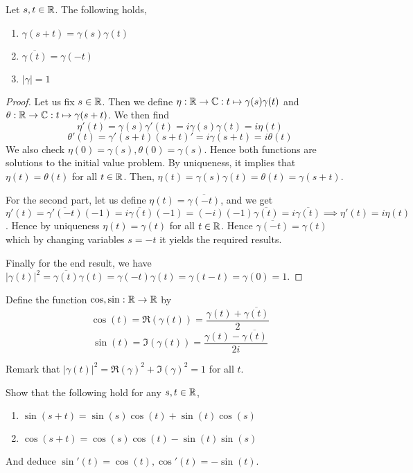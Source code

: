\begin{proposition}
    Let $s,t\in\mathbb R$. The following holds,
    \begin{enumerate}
        \item $\gamma(s+t)=\gamma(s)\gamma(t)$
        \item $\overline{\gamma(t)}=\gamma(-t)$
        \item $|\gamma|=1$
    \end{enumerate}
\end{proposition}
\begin{proof}
    Let us fix $s\in\mathbb R$. Then we define $\eta:\mathbb R\to\mathbb C:t\mapsto\gamma(s)\gamma(t)$ and
    $\theta:\mathbb R\to\mathbb C:t\mapsto\gamma(s+t)$. We then find
    \[\eta'(t)= \gamma(s)\gamma'(t)=i\gamma(s)\gamma(t)=i\eta(t)\]
    \[\theta'(t)= \gamma'(s+t) (s+t)'= i\gamma(s+t)=i\theta(t)\]
    We also check $\eta(0)=\gamma(s), \theta(0)=\gamma(s)$. Hence both functions are
    solutions to the initial value problem. By uniqueness, it implies that
    $\eta(t)=\theta(t)$ for all $t\in\mathbb R$. Then,
    $\eta(t)=\gamma(s)\gamma(t)=\theta(t)=\gamma(s+t)$.

    For the second part, let us define $\eta(t)=\overline{\gamma(-t)}$, and we get
    $\eta'(t)=\overline{\gamma'(-t)}(-1)=\overline{i\gamma(t)}(-1)=(-i)(-1)\overline{\gamma(t)}=
    i\overline{\gamma(t)}\implies \eta'(t)=i\eta(t)$. Hence by uniqueness
    $\eta(t)=\gamma(t)$ for all $t\in\mathbb R$. Hence $\overline{\gamma(-t)}=\gamma(t)$ which
    by changing variables $s=-t$ it yields the required results.
    
    Finally for the end result, we have $|\gamma(t)|^2=\overline{\gamma(t)}\gamma(t)=
    \gamma(-t)\gamma(t)=\gamma(t-t)=\gamma(0)=1$.
\end{proof}


\begin{definition}
    Define the function $\cos,\sin:\mathbb R\to\mathbb R$ by
    \[\cos(t)=\Re(\gamma(t))=\frac{\gamma(t)+\overline{\gamma(t)}}{2}\]
    \[\sin(t)=\Im(\gamma(t))=\frac{\gamma(t)-\overline{\gamma(t)}}{2i}\]
    \label{def:sincos}
\end{definition}
Remark that $|\gamma(t)|^2=\Re(\gamma)^2+\Im(\gamma)^2=1$ for all $t$.

\begin{exercise}
    Show that the following hold for any $s,t\in\mathbb R$,
    \begin{enumerate}
        \item $\sin(s+t)= \sin(s)\cos(t)+\sin(t)\cos(s)$
        \item $\cos(s+t)= \cos(s)\cos(t)-\sin(t)\sin(s)$
    \end{enumerate}
    And deduce $\sin'(t)=\cos(t), \cos'(t)=-\sin(t)$.
    \label{ex:trigIdG}
\end{exercise}

